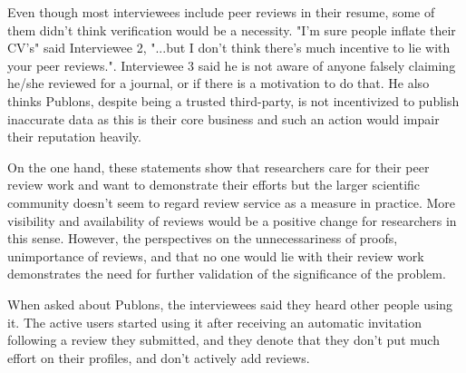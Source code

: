 Even though most interviewees include peer reviews in their resume, some of them didn't think verification would be a necessity. "I'm sure people inflate their CV's" said Interviewee 2, "...but I don't think there's much incentive to lie with your peer reviews.". Interviewee 3 said he is not aware of anyone falsely claiming he/she reviewed for a journal, or if there is a motivation to do that. He also thinks Publons, despite being a trusted third-party, is not incentivized to publish inaccurate data as this is their core business and such an action would impair their reputation heavily. 

On the one hand, these statements show that researchers care for their peer review work and want to demonstrate their efforts but the larger scientific community doesn't seem to regard review service as a measure in practice. More visibility and availability of reviews would be a positive change for researchers in this sense. However, the perspectives on the unnecessariness of proofs, unimportance of reviews, and that no one would lie with their review work demonstrates the need for further validation of the significance of the problem.

When asked about Publons, the interviewees said they heard other people using it. The active users started using it after receiving an automatic invitation following a review they submitted, and they denote that they don't put much effort on their profiles, and don't actively add reviews. 

